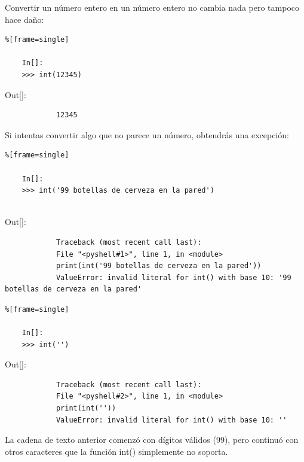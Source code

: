 Convertir un número entero en un número entero no cambia nada pero tampoco hace daño:


\begin{lstlisting}%[frame=single]
	
	In[]:	
	>>> int(12345)	
\end{lstlisting}

{\ttfamily\scriptsize\scriptsize 
	\hspace{-0.65cm}Out[]:\vspace{-0.15cm}	
	{\color{blue} 	
		\begin{verbatim}
			12345
		\end{verbatim}
}}

Si intentas convertir algo que no parece un número, obtendrás una excepción:

\begin{lstlisting}%[frame=single]
	
	In[]:	
	>>> int('99 botellas de cerveza en la pared')
	
\end{lstlisting}

{\ttfamily\scriptsize\scriptsize 
	\hspace{-0.65cm}Out[]:\vspace{-0.15cm}	
	{\color{red} 	
		\begin{verbatim}
			Traceback (most recent call last):
			File "<pyshell#1>", line 1, in <module>
			print(int('99 botellas de cerveza en la pared'))
			ValueError: invalid literal for int() with base 10: '99 botellas de cerveza en la pared'
		\end{verbatim}
}}




\begin{lstlisting}%[frame=single]
	
	In[]:	
	>>> int('')	
\end{lstlisting}

{\ttfamily\scriptsize\scriptsize 
	\hspace{-0.65cm}Out[]:\vspace{-0.15cm}	
	{\color{red} 	
		\begin{verbatim}
			Traceback (most recent call last):
			File "<pyshell#2>", line 1, in <module>
			print(int(''))
			ValueError: invalid literal for int() with base 10: ''	
		\end{verbatim}
}}


La cadena de texto anterior comenzó con dígitos válidos (99), pero continuó
con otros caracteres que la función {\ttfamily int()} simplemente no soporta.\\

